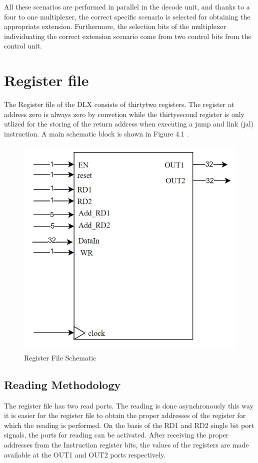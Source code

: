     All these scenarios are performed in parallel in the decode unit, and thanks to a four to one multiplexer, the correct specific scenario is selected for obtaining
    the appropriate extension. Furthermore, the selection bits of the multiplexer individuating the correct extension scenario come from two control bits from the control unit.

\section {Register file}

    The Register file of the DLX consists of thirtytwo registers. The register at address zero is always zero by convetion while the thirtysecond
    register is only utlized for the storing of the return address when executing a jump and link (jal) instruction. A main schematic block is shown in Figure 4.1 .

\begin{figure}[h!]
    \centering
    \includegraphics[scale = 0.45]
    {chapters/figures/RegisterFile}
    \caption{Register File Schematic }
    \label{fig:RFpic}
    \end{figure}

        \subsection{Reading Methodology}
        The register file has two read ports. The reading is done asynchronously this way it is easier for the register file to obtain the proper
        addresses of the register for which the reading is performed. On the basis of the RD1 and RD2 single bit port signals, the ports for reading can be activated.
        After receiving the proper addresses from the Instruction register bits, the values of the registers are made available at the OUT1 and OUT2 ports respectively.

